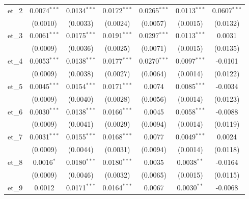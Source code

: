 \begin{tabular}{lcccccc}
   et\_2              & 0.0074$^{***}$   & 0.0134$^{***}$       & 0.0172$^{***}$        & 0.0265$^{***}$  & 0.0113$^{***}$  & 0.0607$^{***}$\\   
                      & (0.0010)         & (0.0033)             & (0.0024)              & (0.0057)        & (0.0015)        & (0.0132)\\   
   et\_3              & 0.0061$^{***}$   & 0.0175$^{***}$       & 0.0191$^{***}$        & 0.0297$^{***}$  & 0.0113$^{***}$  & 0.0031\\   
                      & (0.0009)         & (0.0036)             & (0.0025)              & (0.0071)        & (0.0015)        & (0.0135)\\   
   et\_4              & 0.0053$^{***}$   & 0.0138$^{***}$       & 0.0177$^{***}$        & 0.0270$^{***}$  & 0.0097$^{***}$  & -0.0101\\   
                      & (0.0009)         & (0.0038)             & (0.0027)              & (0.0064)        & (0.0014)        & (0.0122)\\   
   et\_5              & 0.0045$^{***}$   & 0.0154$^{***}$       & 0.0171$^{***}$        & 0.0074          & 0.0085$^{***}$  & -0.0034\\   
                      & (0.0009)         & (0.0040)             & (0.0028)              & (0.0056)        & (0.0014)        & (0.0123)\\   
   et\_6              & 0.0030$^{***}$   & 0.0138$^{***}$       & 0.0166$^{***}$        & 0.0045          & 0.0058$^{***}$  & -0.0088\\   
                      & (0.0009)         & (0.0041)             & (0.0029)              & (0.0094)        & (0.0014)        & (0.0119)\\   
   et\_7              & 0.0031$^{***}$   & 0.0155$^{***}$       & 0.0168$^{***}$        & 0.0077          & 0.0049$^{***}$  & 0.0024\\   
                      & (0.0009)         & (0.0044)             & (0.0031)              & (0.0094)        & (0.0014)        & (0.0118)\\   
   et\_8              & 0.0016$^{*}$     & 0.0180$^{***}$       & 0.0180$^{***}$        & 0.0035          & 0.0038$^{**}$   & -0.0164\\   
                      & (0.0009)         & (0.0046)             & (0.0032)              & (0.0065)        & (0.0015)        & (0.0115)\\   
   et\_9              & 0.0012           & 0.0171$^{***}$       & 0.0164$^{***}$        & 0.0067          & 0.0030$^{**}$   & -0.0068\\   

\end{tabular}
